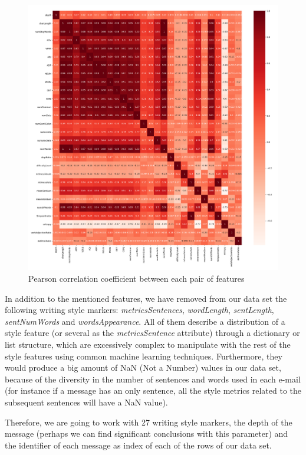 \begin{figure}[p]
	\centering%
	\centerline{\includegraphics[width=0.98\paperwidth]{Imagenes/Bitmap/correlationmatrix.png}}%
	\caption{Pearson correlation coefficient between each pair of features}%
	\label{fig:correlation}
\end{figure}

In addition to the mentioned features, we have removed from our data set the following writing style markers: \textit{metricsSentences}, \textit{wordLength}, \textit{sentLength}, \textit{sentNumWords} and \textit{wordsAppearance}. All of them describe a distribution of a style feature (or several as the \textit{metricsSentence} attribute) through a dictionary or list structure, which are excessively complex to manipulate with the rest of the style features using common machine learning techniques. Furthermore, they would produce a big amount of NaN (Not a Number) values in our data set, because of the diversity in the number of sentences and words used in each e-mail (for instance if a message has an only sentence, all the style metrics related to the subsequent sentences will have a NaN value).

Therefore, we are going to work with 27 writing style markers, the depth of the message (perhaps we can find significant conclusions with this parameter) and the identifier of each message as index of each of the rows of our data set.

